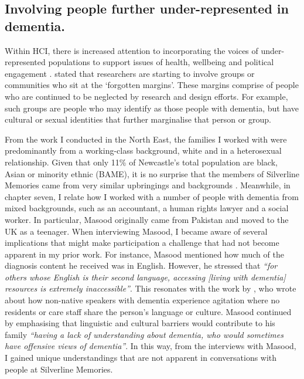 \subsection{Involving people further under-represented in dementia.}
\label{Under-represented--dementia}
Within HCI, there is increased attention to incorporating the voices of under-represented populations to support issues of health, wellbeing and political engagement \citep{erete_intersectional_2018}. \cite{harrington_forgotten_2020} stated that researchers are starting to involve groups or communities who sit at the `forgotten margins'. These margins comprise of people who are continued to be neglected by research and design efforts. For example, such groups are people who may identify as those people with dementia, but have cultural or sexual identities that further marginalise that person or group. 

From the work I conducted in the North East, the families I worked with were predominantly from a working-class background, white and in a heterosexual relationship. Given that only 11\% of Newcastle's total population are black, Asian or minority ethnic (BAME), it is no surprise that the members of Silverline Memories came from very similar upbringings and backgrounds \citep{cityCouncil_2021}. Meanwhile, in chapter seven, I relate how I worked with a number of people with dementia from mixed backgrounds, such as an accountant, a human rights lawyer and a social worker. In particular, Masood originally came from Pakistan and moved to the UK as a teenager. When interviewing Masood, I became aware of several implications that might make participation a challenge that had not become apparent in my prior work. For instance, Masood mentioned how much of the diagnosis content he received was in English. However, he stressed that \textit{``for others whose English is their second language, accessing [living with dementia] resources is extremely inaccessible''}. This resonates with the work by \cite{cooper2018relationship}, who wrote about how non-native speakers with dementia experience agitation where no residents or care staff share the person's language or culture. Masood continued by emphasising that linguistic and cultural barriers would contribute to his family \textit{``having a lack of understanding about dementia, who would sometimes have offensive views of dementia''}. In this way, from the interviews with Masood, I gained unique understandings that are not apparent in conversations with people at Silverline Memories. 

